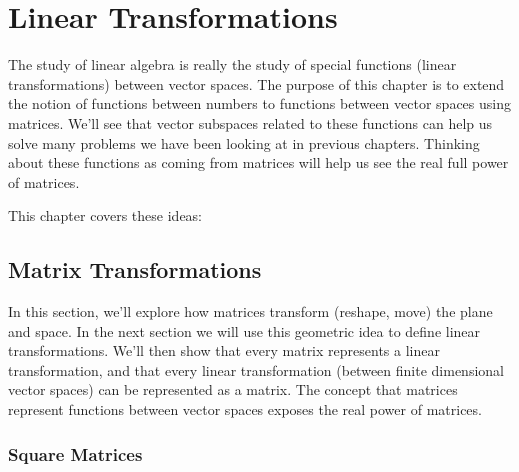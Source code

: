 \chapter{Linear Transformations}

The study of linear algebra is really the study of special functions (linear transformations) between vector spaces.  The purpose of this chapter is to extend the notion of functions between numbers to functions between vector spaces using matrices.  We'll see that vector subspaces related to these functions can help us solve many problems we have been looking at in previous chapters.  Thinking about these functions as coming from matrices will help us see the real full power of matrices.

This chapter covers these ideas:


\section{Matrix Transformations}

%
In this section, we'll explore how matrices transform (reshape, move) the plane and space.  In the next section we will use this geometric idea to define linear transformations.  We'll then show that every matrix represents a linear transformation, and that every linear transformation (between finite dimensional vector spaces) can be represented as a matrix.  
The concept that matrices represent functions between vector spaces exposes the real power of matrices. 

\subsection{Square Matrices}

